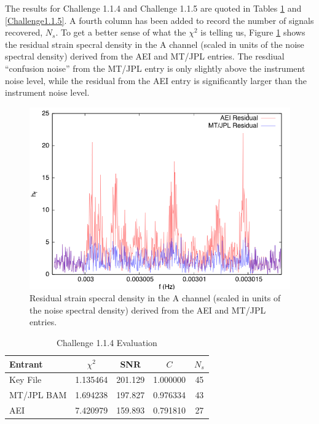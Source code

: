 \documentclass[11pt]{article}
\begin{document}
The results for
Challenge 1.1.4 and Challenge 1.1.5 are quoted in Tables \ref{Challenge1.1.4} and
\ref{Challenge1.1.5}. A fourth column has been added to record the number of
signals recovered, $N_s$. To get a better sense of what the $\chi^2$ is telling us,
Figure \ref{res1.1.4} shows the residual strain specral density in the A channel
(scaled in units of the noise spectral density) derived from the AEI and MT/JPL
entries. The resdiual ``confusion noise'' from the MT/JPL entry is only slightly
above the instrument noise level, while the residual from the AEI entry is significantly
larger than the instrument noise level.


\begin{figure}[h]
\includegraphics[angle=0,width=1.0\textwidth]{res_1_1_4.png}
\caption{\label{res1.1.4}Residual strain specral density in the A channel
(scaled in units of the noise spectral density) derived from the AEI and MT/JPL
entries.}
\end{figure}

\begin{table}[t]
\caption{\label{Challenge1.1.4}Challenge 1.1.4 Evaluation}
\begin{center}
\begin{tabular}{|l|c|c|c|c|}
\hline
Entrant  & $\chi^2$ & SNR & $C$ & $N_s$\\
 \hline
Key File   & 1.135464 & 201.129 & 1.000000 & 45\\
MT/JPL BAM & 1.694238 & 197.827 & 0.976334 & 43\\
AEI        & 7.420979 & 159.893 & 0.791810 & 27\\
\hline  
\end{tabular}
\end{center}
\end{table}
\end{document}
